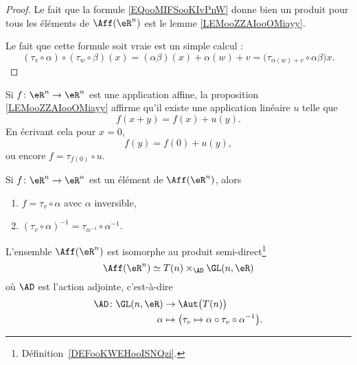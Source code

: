 \begin{proof}
    Le fait que la formule \eqref{EQooMIFSooKIvPnW} donne bien un produit pour tous les éléments de \( \Aff(\eR^n)\) est le lemme \ref{LEMooZZAIooOMiayy}.

    Le fait que cette formule soit vraie est un simple calcul :
    \begin{equation}
        (\tau_v\circ\alpha)\circ(\tau_w\circ\beta)(x)=(\alpha\beta)(x)+\alpha(w)+v=\big( \tau_{\alpha(w)+v}\circ \alpha\beta\big)x.
    \end{equation}
\end{proof}

Si \( f\colon \eR^n\to \eR^n\) est une application affine, la proposition \ref{LEMooZZAIooOMiayy} affirme qu'il existe une application linéaire \( u\) telle que
\begin{equation}
    f(x+y)=f(x)+u(y).
\end{equation}
En écrivant cela pour \( x=0\),
\begin{equation}
    f(y)=f(0)+u(y),
\end{equation}
ou encore \( f=\tau_{f(0)}\circ u\).

\begin{lemma}     \label{LEMooUBGZooBIlmAN}
    Si \( f\colon \eR^n\to \eR^n\) est un élément de \( \Aff(\eR^n)\), alors 
    \begin{enumerate}
        \item
    \( f=\tau_v\circ \alpha\) avec \( \alpha\) inversible,
\item
    \( (\tau_v\circ\alpha)^{-1}=\tau_{\alpha^{-1}}\circ \alpha^{-1}\).
    \end{enumerate}
\end{lemma}

\begin{proposition}  \label{PROPooTPFZooKtFxhg}
    L'ensemble \( \Aff(\eR^n)\) est isomorphe au produit semi-direct\footnote{Définition~\ref{DEFooKWEHooISNQzi}.}
    \begin{equation}
        \Aff(\eR^n)\simeq  T(n)\times_{\AD}\GL(n,\eR)
    \end{equation}
    où \( \AD\) est l'action adjointe, c'est-à-dire
    \begin{equation}
        \begin{aligned}
            \AD\colon \GL(n,\eR)&\to \Aut\big( T(n) \big) \\
            \alpha&\mapsto\big( \tau_v\mapsto \alpha\circ\tau_v\circ\alpha^{-1}\big).
        \end{aligned}
    \end{equation}
\end{proposition}


